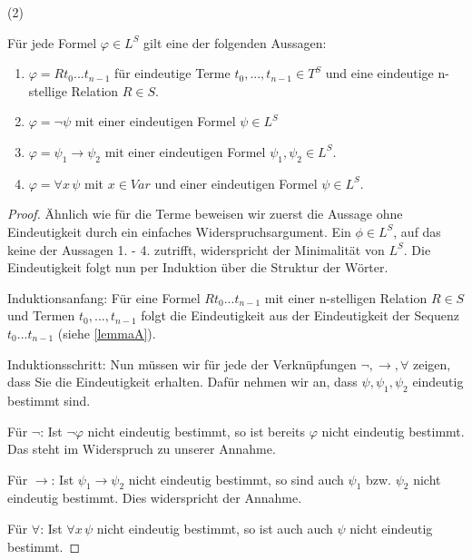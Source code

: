 \documentclass{article}
\theoremstyle{definition}
\theoremstyle{plain}
\theoremstyle{remark}
\newcommand{\unteraufgabe}[1]{
  {
  \vspace*{0.2cm}
	\noindent\textsf{(#1)}
  }
}
\newcommand{\induktionsanfang}{
  {
  \vspace*{0.1cm}
  \noindent
  \textsf{Induktionsanfang:}
  }
}
\newcommand{\induktionsschritt}{
  {
  \vspace*{0.1cm}
  \noindent
  \textsf{Induktionsschritt:}
  }
}
\begin{document}
\unteraufgabe2
Für jede Formel $\varphi\in L^S$ gilt eine der folgenden Aussagen:
\begin{enumerate}
	\item $\varphi=Rt_0...t_{n-1}$ für eindeutige Terme $t_0,...,t_{n-1}\in T^S$ und eine eindeutige n-stellige Relation $R\in S$.
	\item $\varphi=\neg\psi$ mit einer eindeutigen Formel $\psi\in L^S$
	\item $\varphi=\psi_1\to\psi_2$ mit einer eindeutigen Formel $\psi_1,\psi_2\in L^S$.
	\item $\varphi=\forall x \,\psi$ mit $x\in Var$ und einer eindeutigen Formel $\psi\in L^S$.
\end{enumerate}
\begin{proof}
	Ähnlich wie für die Terme beweisen wir zuerst die Aussage ohne Eindeutigkeit durch ein einfaches Widerspruchsargument. Ein $\phi\in L^S$, auf das keine der Aussagen 1. - 4. zutrifft, widerspricht der Minimalität von $L^S$.
	Die Eindeutigkeit folgt nun per Induktion über die Struktur der Wörter.

	\induktionsanfang Für eine Formel $Rt_0...t_{n-1}$ mit einer n-stelligen Relation $R\in S$ und Termen $t_0,...,t_{n-1}$ folgt die Eindeutigkeit aus der Eindeutigkeit der Sequenz $t_0...t_{n-1}$ (siehe \cref{lemmaA}).
	
	\induktionsschritt Nun müssen wir für jede der Verknüpfungen $\neg, \to, \forall$ zeigen, dass Sie die Eindeutigkeit erhalten. Dafür nehmen wir an, dass $\psi, \psi_1,\psi_2$ eindeutig bestimmt sind.\smallskip
	
	Für $\neg$: Ist $\neg \varphi$ nicht eindeutig bestimmt, so ist bereits $\varphi$ nicht eindeutig bestimmt. Das steht im Widerspruch zu unserer Annahme. \smallskip

	Für $\to$: Ist $\psi_1\to\psi_2$ nicht eindeutig bestimmt, so sind auch $\psi_1$ bzw. $\psi_2$ nicht eindeutig bestimmt. Dies widerspricht der Annahme. \smallskip

	Für $\forall$: Ist $\forall x \,\psi$ nicht eindeutig bestimmt, so ist auch auch $\psi$ nicht eindeutig bestimmt.
\end{proof}
\end{document}
